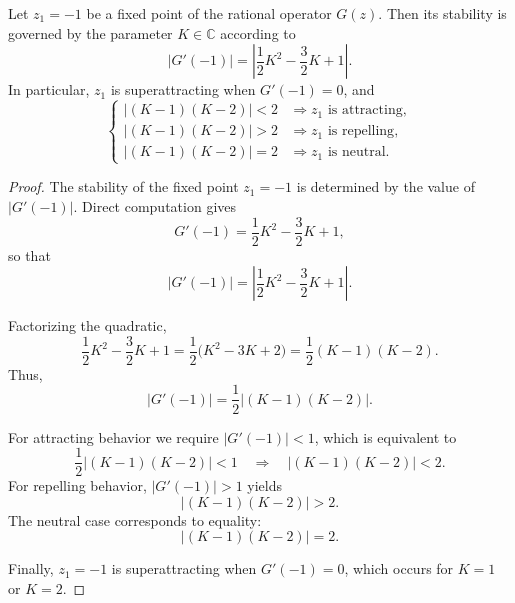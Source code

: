 \documentclass[10pt,a4paper]{amsart}
\begin{document}
\begin{theorem}\label{thm:especial1}
	Let \( z_{1} = -1 \) be a fixed point of the rational operator \( G(z) \).
	Then its stability is governed by the parameter \( K \in \mathbb{C} \) according to
	\[
	|G'(-1)| = \left| \frac{1}{2} K^{2} - \frac{3}{2} K + 1 \right|.
	\]
	In particular, $z_1$ is superattracting when $G'(-1) = 0$, and
	\[
	\begin{cases}
		\left| \left(K -1\right) \left(K -2\right) \right|  < 2  & \Rightarrow z_{1} \text{ is attracting}, \\[6pt]
		\left| \left(K -1\right) \left(K -2\right) \right|  > 2  & \Rightarrow z_{1} \text{ is repelling}, \\[6pt]
		\left| \left(K -1\right) \left(K -2\right) \right|  = 2  & \Rightarrow z_{1} \text{ is neutral}.
	\end{cases}
	\]
\end{theorem}

\begin{proof}
	The stability of the fixed point \( z_1 = -1 \) is determined by the value of \( |G'(-1)| \).
	Direct computation gives
	\[
	G'(-1) = \frac{1}{2}K^2 - \frac{3}{2}K + 1,
	\]
	so that
	\[
	|G'(-1)| = \left| \frac{1}{2}K^2 - \frac{3}{2}K + 1 \right|.
	\]

	Factorizing the quadratic,
	\[
	\frac{1}{2}K^2 - \frac{3}{2}K + 1 = \frac{1}{2}\big( K^2 - 3K + 2 \big) = \frac{1}{2}(K-1)(K-2).
	\]
	Thus,
	\[
	|G'(-1)| = \frac{1}{2}\left| (K-1)(K-2) \right|.
	\]

	For attracting behavior we require \( |G'(-1)| < 1 \), which is equivalent to
	\[
	\frac{1}{2}\left| (K-1)(K-2) \right| < 1 \quad \Longrightarrow \quad \left| (K-1)(K-2) \right| < 2.
	\]
	For repelling behavior, \( |G'(-1)| > 1 \) yields
	\[
	\left| (K-1)(K-2) \right| > 2.
	\]
	The neutral case corresponds to equality:
	\[
	\left| (K-1)(K-2) \right| = 2.
	\]

	Finally, \( z_1 = -1 \) is superattracting when \( G'(-1) = 0 \), which occurs for \( K = 1 \) or \( K = 2 \).
\end{proof}
\end{document}
